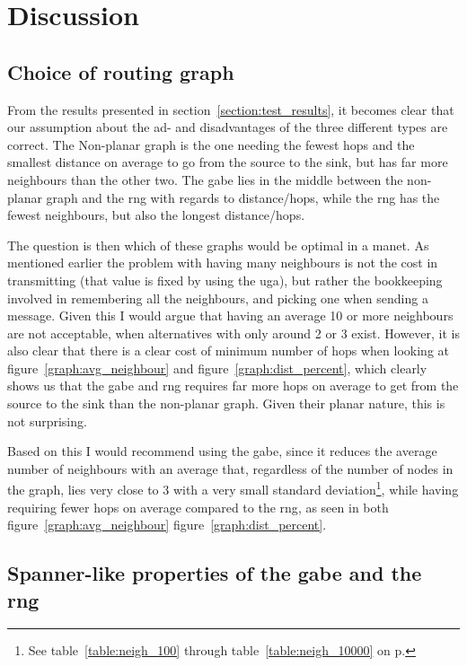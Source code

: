\section{Discussion}
\label{section:discussion}

\subsection{Choice of routing graph}

From the results presented in section~\ref{section:test_results}, it becomes clear that our assumption about the ad- and disadvantages of the three different types are correct. The Non-planar graph is the one needing the fewest hops and the smallest distance on average to go from the source to the sink, but has far more neighbours than the other two. The \ac{gabe} lies in the middle between the non-planar graph and the \ac{rng} with regards to distance/hops, while the \ac{rng} has the fewest neighbours, but also the longest distance/hops. 

The question is then which of these graphs would be optimal in a \ac{manet}. As mentioned earlier the problem with having many neighbours is not the cost in transmitting (that value is fixed by using the \ac{uga}), but rather the bookkeeping involved in remembering all the neighbours, and picking one when sending a message. Given this I would argue that having an average 10 or more neighbours are not acceptable, when alternatives with only around 2 or 3 exist. However, it is also clear that there is a clear cost of minimum number of hops when looking at figure~\ref{graph:avg_neighbour} and figure~\ref{graph:dist_percent}, which clearly shows us that the \ac{gabe} and \ac{rng} requires far more hops on average to get from the source to the sink than the non-planar graph. Given their planar nature, this is not surprising. 

Based on this I would recommend using the \ac{gabe}, since it reduces the average number of neighbours with an average that, regardless of the number of nodes in the graph, lies very close to 3 with a very small standard deviation\footnote{See table~\ref{table:neigh_100} through table~\ref{table:neigh_10000} on p. \pageref{table:neigh_100}}, while having requiring fewer hops on average compared to the \ac{rng}, as seen in both figure~\ref{graph:avg_neighbour} figure~\ref{graph:dist_percent}.

\subsection{Spanner-like properties of the \ac{gabe} and the \ac{rng}}


